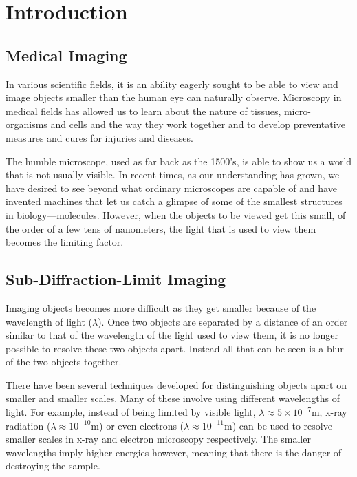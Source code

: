 \chapter{Introduction}
\label{prt:introduction}

\section{Medical Imaging}
\label{sec:section_name}

In various scientific fields, it is an ability eagerly sought to be able to
view and image objects smaller than the human eye can naturally observe.
Microscopy in medical fields has allowed us to learn about the nature of
tissues, micro-organisms and cells and the way they work together and to
develop preventative measures and cures for injuries and diseases.

The humble microscope, used as far back as the 1500's, is able to show us a
world that is not usually visible. In recent times, as our understanding has
grown, we have desired to see beyond what ordinary microscopes are capable of
and have invented machines that let us catch a glimpse of some of the smallest
structures in biology---molecules. However, when the objects to be viewed get
this small, of the order of a few tens of nanometers, the light that is used to
view them becomes the limiting factor.

\section{Sub-Diffraction-Limit Imaging}
\label{sec:sub_diffraction_limit_imaging}

Imaging objects becomes more difficult as they get smaller because of the
wavelength of light ($\lambda$). Once two objects are separated by a distance
of an order similar to that of the wavelength of the light used to view them,
it is no longer possible to resolve these two objects apart. Instead all that
can be seen is a blur of the two objects together.

There have been several techniques developed for distinguishing objects apart
on smaller and smaller scales. Many of these involve using different
wavelengths of light.  For example, instead of being limited by visible light,
$\lambda \approx 5\times 10^{-7} \textrm{m}$, x-ray radiation ($\lambda \approx
10^{-10} \textrm{m}$) or even electrons ($\lambda \approx 10^{-11} \textrm{m}$)
can be used to resolve smaller scales in x-ray and electron microscopy
respectively. The smaller wavelengths imply higher energies however, meaning
that there is the danger of destroying the sample.

